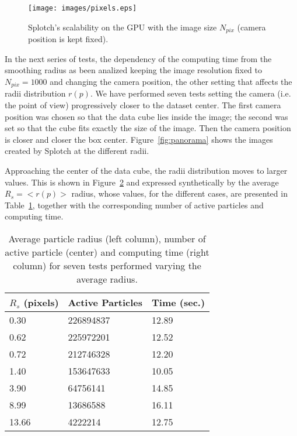\documentclass[1p]{elsarticle}
\begin{document}
\begin{figure}
\centering
\texttt{[image: images/pixels.eps]}
\caption{Splotch's scalability on the GPU with the image size $N_{pix}$ (camera position is 
kept fixed).}
\label{fig:pixels}
\end{figure}

In the next series of tests, the dependency of the computing time from the smoothing 
radius as been analized keeping the image resolution fixed to $N_{pix} = 1000$ 
and changing the camera position, the other setting that affects the radii 
distribution $r(p)$. 
We have performed seven tests
setting the camera (i.e. the point of view) progressively closer to the dataset center. 
The first camera position was chosen so that the data cube lies inside the image; the second was set so that the cube fits exactly the size of the image. Then the camera position is closer and closer the box center. Figure~\ref{fig:panorama} shows the images created by Splotch at the different radii.
 
Approaching the center of the 
data cube, the radii distribution moves to larger values. This is 
shown in Figure~\ref{fig:radii} and expressed synthetically 
by the average $R_s=<r(p)>$ radius, whose values, for the different cases, are presented in 
Table~\ref{tab:radius}, together with the corresponding number of active particles and computing time. 

\begin{figure}
\centering
\caption{
}
\label{fig:radii}
\end{figure}

\begin{table}
\begin{center}
\begin{tabular}{|l|l|l|}
\hline
$R_s$ (pixels) & Active Particles & Time (sec.) \\
\hline
0.30   & 226894837  & 12.89 \\
\hline
0.62   & 225972201  & 12.52 \\
\hline
0.72   & 212746328  & 12.20 \\
\hline
1.40   & 153647633  & 10.05 \\
\hline
3.90   & 64756141   & 14.85 \\
\hline
8.99   & 13686588   & 16.11 \\
\hline
13.66  & 4222214    & 12.75 \\
\hline
\end{tabular}
\end{center}
\caption{Average particle radius (left column), number of active particle (center)
and computing time (right column) for seven tests performed varying the average radius.}
\label{tab:radius}
\end{table}
\end{document}
